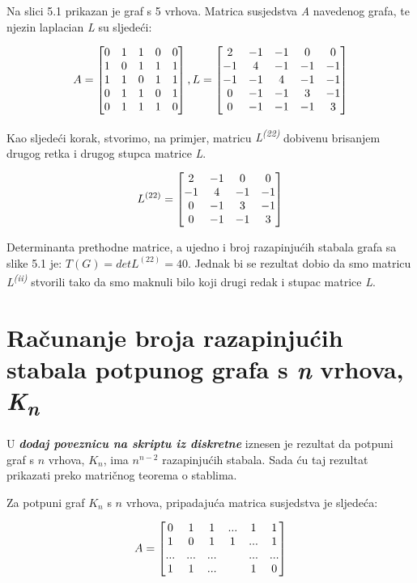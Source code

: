 \documentclass[times, utf8, zavrsni]{fer}
\begin{document}
Na slici 5.1 prikazan je graf s 5 vrhova. Matrica susjedstva \textit{A} navedenog grafa, te njezin laplacian \textit{L} su sljedeći:

\[
\centering
A = 
\begin{bmatrix}
	0 & 1 & 1 & 0 & 0 \\
	1 & 0 & 1 & 1 & 1 \\
	1 & 1 & 0 & 1 & 1 \\
	0 & 1 & 1 & 0 & 1 \\
	0 & 1 & 1 & 1 & 0
\end{bmatrix}
,
L = 
\begin{bmatrix}
	2 & -1 & -1 & 0 & 0 \\
	-1 & 4 & -1 & -1 & -1 \\
	-1 & -1 & 4 & -1 & -1 \\
	0 & -1 & -1 & 3 & -1 \\
	0 & -1 & -1 & -1 & 3
\end{bmatrix}
\]

Kao sljedeći korak, stvorimo, na primjer, matricu \textit{L\textsuperscript{(22)}} dobivenu brisanjem drugog retka i drugog stupca matrice \textit{L}.

\[
\centering
L^{(22)} = 
\begin{bmatrix}
	2 & -1 & 0 & 0 \\
	-1 & 4 & -1 & -1 \\
	0 & -1 & 3 & -1 \\
	0 & -1 & -1 & 3
\end{bmatrix}
\]

Determinanta prethodne matrice, a ujedno i broj razapinjućih stabala grafa sa slike 5.1 je: $T(G) = det L^{(22)} = 40$. Jednak bi se rezultat dobio da smo matricu \textit{L\textsuperscript{(ii)}} stvorili tako da smo maknuli bilo koji drugi redak i stupac matrice \textit{L}.

\section{Računanje broja razapinjućih stabala potpunog grafa s \textit{n} vrhova, \textit{K\textsubscript{n}}}

U \textbf{\textit{dodaj poveznicu na skriptu iz diskretne}} iznesen je rezultat da potpuni graf s $n$ vrhova, $K_n$, ima $n^{n-2}$ razapinjućih stabala. Sada ću taj rezultat prikazati preko matričnog teorema o stablima.

Za potpuni graf $K_n$ s $n$ vrhova, pripadajuća matrica susjedstva je sljedeća:

\[
\centering
A = 
\begin{bmatrix}
	0 & 1 & 1 & ... & 1 & 1 \\
	1 & 0 & 1 & 1 & ... & 1 \\
	... & ... & ... & & ... & ...  \\
	1 & 1 & ... & & 1 & 0
\end{bmatrix}
\]
\end{document}
